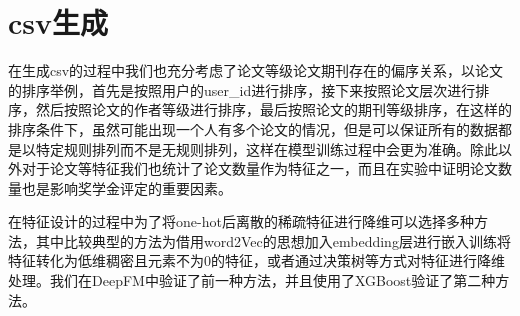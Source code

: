 \section{csv生成}

在生成csv的过程中我们也充分考虑了论文等级论文期刊存在的偏序关系，以论文的排序举例，首先是按照用户的user\_id进行排序，接下来按照论文层次进行排序，然后按照论文的作者等级进行排序，最后按照论文的期刊等级排序，在这样的排序条件下，虽然可能出现一个人有多个论文的情况，但是可以保证所有的数据都是以特定规则排列而不是无规则排列，这样在模型训练过程中会更为准确。除此以外对于论文等特征我们也统计了论文数量作为特征之一，而且在实验中证明论文数量也是影响奖学金评定的重要因素。

在特征设计的过程中为了将one-hot后离散的稀疏特征进行降维可以选择多种方法，其中比较典型的方法为借用word2Vec的思想加入embedding层进行嵌入训练将特征转化为低维稠密且元素不为0的特征，或者通过决策树等方式对特征进行降维处理。我们在DeepFM中验证了前一种方法，并且使用了XGBoost验证了第二种方法。

